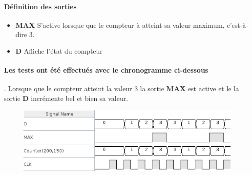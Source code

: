 \documentclass[a4paper]{article} %
\begin{document}
\begin{tcolorbox}[colframe=Monokaimagenta,colback=white]
\paragraph{Définition des sorties}
\begin{itemize}

    \item     \textbf{MAX} S'active lorsque que le compteur à atteint sa valeur maximum, c'est-à-dire 3.
    \item     \textbf{D} Affiche l'état du compteur
\end{itemize}



\paragraph{Les tests ont été effectués avec le chronogramme ci-dessous}. Lorsque que le compteur atteint la valeur $3$ la sortie \textbf{MAX} est active et le la sortie \textbf{D} incrémente bel et bien sa valeur.

\begin{figure}[H]
\centering
    \includegraphics[width=.8\textwidth]{src/chrono_COUNT_4.png}
    \label{fig:count4bits}
\end{figure}

\end{tcolorbox}
\end{document}
